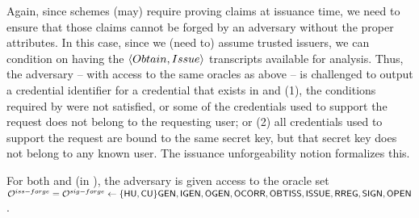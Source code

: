 Again, since \UAS schemes (may) require proving claims at issuance time, we
need to ensure that those claims cannot be forged by an adversary without the
proper attributes. In this case, since we (need to) assume trusted issuers, we
can condition on having the $\langle Obtain,Issue \rangle$ transcripts
available for analysis. Thus, the adversary -- with access to the same oracles
as above -- is challenged to output a credential identifier for a credential
that exists in \CRED and (1), the conditions required by \fissue were not
satisfied, or some of the credentials used to support the request does not
belong to the requesting user; or (2) all credentials used to support the
request are bound to the same secret key, but that secret key does not belong
to any known user. The issuance unforgeability notion formalizes this.

For both \ExpForgeIssue and \ExpForgeSign (in ), the
adversary is given access to the oracle set $\mathcal{O}^{iss-forge} = \mathcal{O}^{sig-forge} \gets
\lbrace\mathsf{HU},\mathsf{CU}\rbrace\mathsf{GEN},\mathsf{IGEN},\mathsf{OGEN},\mathsf{OCORR},\mathsf{OBTISS},\mathsf{ISSUE},\mathsf{RREG},\mathsf{SIGN},\mathsf{OPEN}$.

